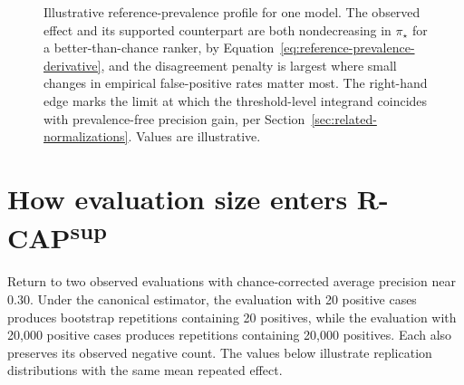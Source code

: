 \documentclass[11pt]{article}
\newcommand{\CAP}{\operatorname{CAP}}
\newcommand{\Tpi}{\CAP_{\pi_\star}}
\newcommand{\RCAPHat}{\widehat{\operatorname{R\text{-}CAP}}{}^{\,\mathrm{sup}}_{\pi_\star}}
\theoremstyle{remark}
\begin{document}
\begin{figure}[ht]
\centering
{}
\caption{Illustrative reference-prevalence profile for one model. The observed effect and its supported counterpart are both nondecreasing in $\pi_\star$ for a better-than-chance ranker, by Equation~\eqref{eq:reference-prevalence-derivative}, and the disagreement penalty is largest where small changes in empirical false-positive rates matter most. The right-hand edge marks the limit at which the threshold-level integrand coincides with prevalence-free precision gain, per Section~\ref{sec:related-normalizations}. Values are illustrative.}
\label{fig:profile}
\end{figure}

\section{How evaluation size enters R-CAP\textsuperscript{sup}}

Return to two observed evaluations with chance-corrected average precision near $0.30$. Under the canonical estimator, the evaluation with 20 positive cases produces bootstrap repetitions containing 20 positives, while the evaluation with 20,000 positive cases produces repetitions containing 20,000 positives. Each also preserves its observed negative count. The values below illustrate replication distributions with the same mean repeated effect.
\end{document}
